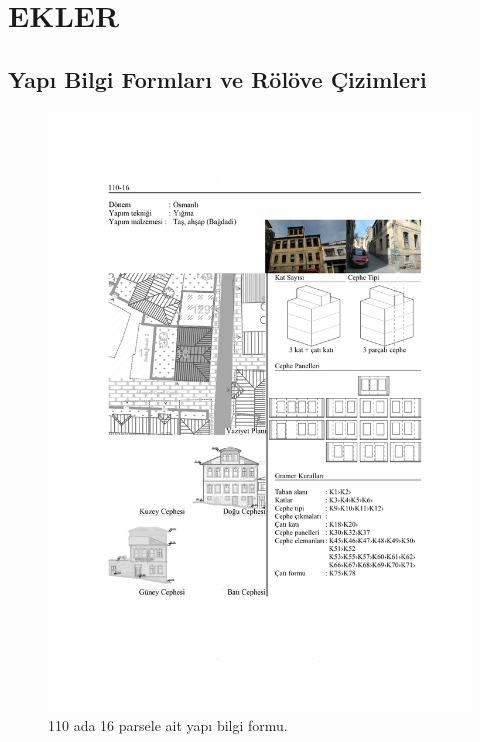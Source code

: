 \chapter{EKLER}
\thispagestyle{empty}

\hypertarget{yapux131-bilgi-formlarux131-ve-ruxf6luxf6ve-uxe7izimleri}{%
\section{Yapı Bilgi Formları ve Rölöve
Çizimleri}\label{yapux131-bilgi-formlarux131-ve-ruxf6luxf6ve-uxe7izimleri}}

\begin{figure}
\centering
\includegraphics[width=1\textwidth,height=\textheight]{source/figures/BilgiFormlari/110-16.pdf}
\caption{110 ada 16 parsele ait yapı bilgi formu.}
\end{figure}

